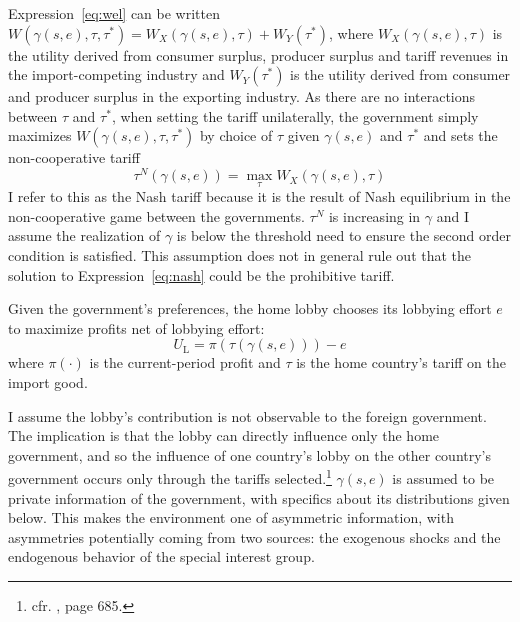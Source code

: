 \documentclass[12pt]{article}
\newtheorem{assumption}{Assumption}
\newcommand{\ga}{\gamma}
\begin{document}


Expression~\ref{eq:wel} can be written $W(\ga(s,e),\tau,\tau^*) = W_X(\ga(s,e),\tau) +W_Y(\tau^*)$, where $W_X(\ga(s,e),\tau)$ is the utility derived from consumer surplus, producer surplus and tariff revenues in the import-competing industry and $W_Y(\tau^*)$ is the utility derived from consumer and producer surplus in the exporting industry. As there are no interactions between $\tau$ and $\tau^*$, when setting the tariff unilaterally, the government simply maximizes $W(\ga(s,e),\tau, \tau^*)$ by choice of $\tau$ given $\ga(s,e)$ and $\tau^*$ and sets the non-cooperative tariff
\begin{equation}
  \tau^N(\ga(s,e)) = \max_\tau W_X(\ga(s,e),\tau)
  \label{eq:nash}
\end{equation}
I refer to this as the Nash tariff because it is the result of Nash equilibrium in the non-cooperative game between the governments. $\tau^N$ is increasing in $\ga$ and I assume the realization of $\ga$ is below the threshold need to ensure the second order condition is satisfied. This assumption does not in general rule out that the solution to Expression~\ref{eq:nash} could be the prohibitive tariff.

Given the government's preferences, the home lobby chooses its lobbying effort $e$ to maximize profits net of lobbying effort:
\begin{equation}
  U_\text{L} = \pi(\tau(\ga(s,e))) - e
  \label{eq:lv3}
\end{equation}
where $\pi(\cdot)$ is the current-period profit and $\tau$ is the home country's tariff on the import good. %

I assume the lobby's contribution is not observable to the foreign government. The implication is that the lobby can directly influence only the home government, and so the influence of one country's lobby on the other country's government occurs only through the tariffs selected.\footnote{cfr. \Textcite{gh95}, page 685.} $\ga(s,e)$ is assumed to be private information of the government, with specifics about its distributions given below. This makes the environment one of asymmetric information, with asymmetries potentially coming from two sources: the exogenous shocks and the endogenous behavior of the special interest group.
\end{document}
